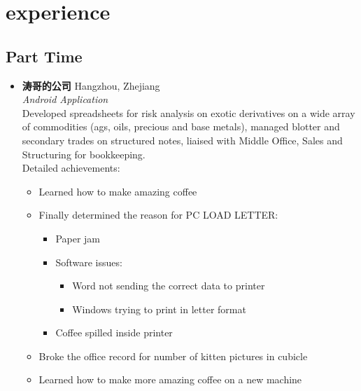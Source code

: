 \documentclass[print]{friggeri-cv} %
\renewenvironment{entrylist}{
  \begin{itemize}[leftmargin=0.8in]
}{
  \end{itemize}
}
\renewcommand{\entry}[4]{
  \item[#1]
    \textbf{#2}
    \hfill
    {\footnotesize\addfontfeature{Color=lightgray} #3}\\%
    #4\vspace{\parsep}
}
\begin{document}

\section{experience}

\subsection{Part Time}

\begin{entrylist}


\entry
{2015.7--Now}
{涛哥的公司}
{Hangzhou, Zhejiang}
{\emph{Android Application} \\
Developed spreadsheets for risk analysis on exotic derivatives on a wide array of commodities (ags, oils, precious and base metals), managed blotter and secondary trades on structured notes, liaised with Middle Office, Sales and Structuring for bookkeeping. \\
Detailed achievements:
\begin{itemize}
\item Learned how to make amazing coffee
\item Finally determined the reason for \textsc{PC LOAD LETTER}:
\begin{itemize}
\item Paper jam
\item Software issues:
\begin{itemize}
\item Word not sending the correct data to printer
\item Windows trying to print in letter format
\end{itemize}
\item Coffee spilled inside printer
\end{itemize}
\item Broke the office record for number of kitten pictures in cubicle
\item Learned how to make more amazing coffee on a new machine
\end{itemize}}


\end{entrylist}
\end{document}

